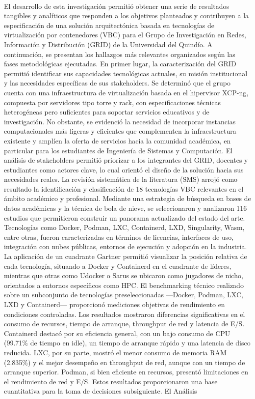 \label{cap:resultados}
\mbox{}\\
El desarrollo de esta investigación permitió obtener una serie de resultados tangibles y analíticos que responden a los objetivos planteados y contribuyen a la especificación de una solución arquitectónica basada en tecnologías de virtualización por contenedores (VBC) para el Grupo de Investigación en Redes, Información y Distribución (GRID) de la Universidad del Quindío. A continuación, se presentan los hallazgos más relevantes organizados según las fases metodológicas ejecutadas. En primer lugar, la caracterización del GRID permitió identificar sus capacidades tecnológicas actuales, su misión institucional y las necesidades específicas de sus stakeholders. Se determinó que el grupo cuenta con una infraestructura de virtualización basada en el hipervisor XCP-ng, compuesta por servidores tipo torre y rack, con especificaciones técnicas heterogéneas pero suficientes para soportar servicios educativos y de investigación. No obstante, se evidenció la necesidad de incorporar instancias computacionales más ligeras y eficientes que complementen la infraestructura existente y amplíen la oferta de servicios hacia la comunidad académica, en particular para los estudiantes de Ingeniería de Sistemas y Computación. El análisis de stakeholders permitió priorizar a los integrantes del GRID, docentes y estudiantes como actores clave, lo cual orientó el diseño de la solución hacia sus necesidades reales. La revisión sistemática de la literatura (SMS) arrojó como resultado la identificación y clasificación de 18 tecnologías VBC relevantes en el ámbito académico y profesional. Mediante una estrategia de búsqueda en bases de datos académicas y la técnica de bola de nieve, se seleccionaron y analizaron 116 estudios que permitieron construir un panorama actualizado del estado del arte. Tecnologías como Docker, Podman, LXC, Containerd, LXD, Singularity, Wasm, entre otras, fueron caracterizadas en términos de licencias, interfaces de uso, integración con nubes públicas, entornos de ejecución y adopción en la industria. La aplicación de un cuadrante Gartner permitió visualizar la posición relativa de cada tecnología, situando a Docker y Containerd en el cuadrante de líderes, mientras que otras como Udocker o Sarus se ubicaron como jugadores de nicho, orientados a entornos específicos como HPC. El benchmarking técnico realizado sobre un subconjunto de tecnologías preseleccionadas ---Docker, Podman, LXC, LXD y Containerd--- proporcionó mediciones objetivas de rendimiento en condiciones controladas. Los resultados mostraron diferencias significativas en el consumo de recursos, tiempo de arranque, throughput de red y latencia de E/S. Containerd destacó por su eficiencia general, con un bajo consumo de CPU (99.71\% de tiempo en idle), un tiempo de arranque rápido y una latencia de disco reducida. LXC, por su parte, mostró el menor consumo de memoria RAM (2.835\%) y el mejor desempeño en throughput de red, aunque con un tiempo de arranque superior. Podman, si bien eficiente en recursos, presentó limitaciones en el rendimiento de red y E/S. Estos resultados proporcionaron una base cuantitativa para la toma de decisiones subsiguiente. El Análisis 